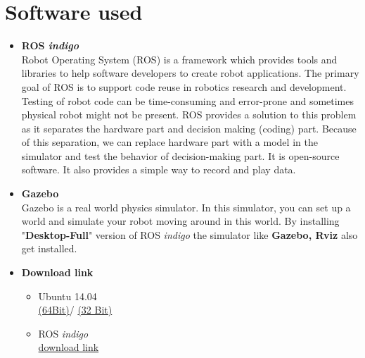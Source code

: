 \documentclass[a4paper,12pt,oneside]{book}
\begin{document}
\section{Software used}
\begin{itemize}
  \item\textbf{ ROS \textit{indigo}}\\
  Robot Operating System (ROS) is a framework which provides tools and libraries to help software developers to create robot applications. The primary goal of ROS is to support code reuse in robotics research and development. Testing of robot code can be time-consuming and error-prone and sometimes physical robot might not be present. ROS provides a solution to this problem as it separates the hardware part and decision making (coding) part. Because of this separation, we can replace hardware part with a model in the simulator and test the behavior of decision-making part. It is open-source software. It also provides a simple way to record and play data.\\
  \item \textbf{Gazebo}\\
  Gazebo is a real world physics simulator. In this simulator, you can set up a world and simulate your robot moving around in this world. By installing  "\textbf{Desktop-Full}" version of ROS \textit{indigo} the simulator like \textbf{Gazebo, Rviz} also get installed.
  
  
 \item \textbf{Download link}
    \begin{itemize}
        \item Ubuntu 14.04 \\
        \href{http://releases.ubuntu.com/trusty/ubuntu-14.04.5-server-amd64.iso}{(64Bit)}/
        \href{http://releases.ubuntu.com/14.04/ubuntu-14.04.5-desktop-i386.iso}{(32 Bit)} 
        \item ROS \textit{indigo}\\
        \href{http://wiki.ros.org/indigo/Installation/Ubuntu}{download link}
    \end{itemize}
\end{itemize}
\end{document}
